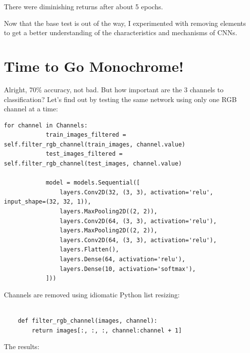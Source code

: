 \documentclass{article}
\begin{document}
    There were diminishing returns after about 5 epochs.

    Now that the base test is out of the way, I experimented with removing elements to get a better understanding of the characteristics and mechanisms of CNNs.

    \section{Time to Go Monochrome!}\label{sec:one-channel}

    Alright, 70\% accuracy, not bad.
    But how important are the 3 channels to classification?
    Let's find out by testing the same network using only one RGB channel at a time:

    \begin{lstlisting}[label={lst:channel_code}]
        for channel in Channels:
            train_images_filtered = self.filter_rgb_channel(train_images, channel.value)
            test_images_filtered = self.filter_rgb_channel(test_images, channel.value)

            model = models.Sequential([
                layers.Conv2D(32, (3, 3), activation='relu', input_shape=(32, 32, 1)),
                layers.MaxPooling2D((2, 2)),
                layers.Conv2D(64, (3, 3), activation='relu'),
                layers.MaxPooling2D((2, 2)),
                layers.Conv2D(64, (3, 3), activation='relu'),
                layers.Flatten(),
                layers.Dense(64, activation='relu'),
                layers.Dense(10, activation='softmax'),
            ]))
    \end{lstlisting}

    Channels are removed using idiomatic Python list resizing:

    \begin{lstlisting}[label={lst:bye-bye-channel}]

    def filter_rgb_channel(images, channel):
        return images[:, :, :, channel:channel + 1]
    \end{lstlisting}

    The results:
\end{document}
